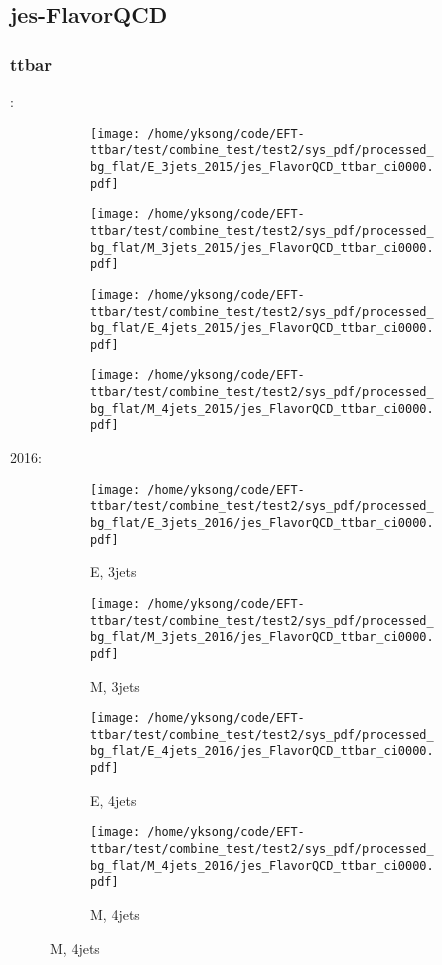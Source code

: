 \documentclass{beamer}
\begin{document}
\subsection{jes-FlavorQCD}

\begin{frame}
\frametitle{ttbar}
\fontsize{5}{1}:
\begin{figure}
\centering
\begin{subfigure}[b]{0.24\textwidth}
\texttt{[image: /home/yksong/code/EFT-ttbar/test/combine\_test/test2/sys\_pdf/processed\_bg\_flat/E\_3jets\_2015/jes\_FlavorQCD\_ttbar\_ci0000.pdf]}
\end{subfigure}
\begin{subfigure}[b]{0.24\textwidth}
\texttt{[image: /home/yksong/code/EFT-ttbar/test/combine\_test/test2/sys\_pdf/processed\_bg\_flat/M\_3jets\_2015/jes\_FlavorQCD\_ttbar\_ci0000.pdf]}
\end{subfigure}
\begin{subfigure}[b]{0.24\textwidth}
\texttt{[image: /home/yksong/code/EFT-ttbar/test/combine\_test/test2/sys\_pdf/processed\_bg\_flat/E\_4jets\_2015/jes\_FlavorQCD\_ttbar\_ci0000.pdf]}
\end{subfigure}
\begin{subfigure}[b]{0.24\textwidth}
\texttt{[image: /home/yksong/code/EFT-ttbar/test/combine\_test/test2/sys\_pdf/processed\_bg\_flat/M\_4jets\_2015/jes\_FlavorQCD\_ttbar\_ci0000.pdf]}
\end{subfigure}
\end{figure}
2016:
\begin{figure}
\centering
\begin{subfigure}[b]{0.24\textwidth}
\texttt{[image: /home/yksong/code/EFT-ttbar/test/combine\_test/test2/sys\_pdf/processed\_bg\_flat/E\_3jets\_2016/jes\_FlavorQCD\_ttbar\_ci0000.pdf]}
\captionsetup{font=tiny}
\caption{E, 3jets}
\end{subfigure}
\begin{subfigure}[b]{0.24\textwidth}
\texttt{[image: /home/yksong/code/EFT-ttbar/test/combine\_test/test2/sys\_pdf/processed\_bg\_flat/M\_3jets\_2016/jes\_FlavorQCD\_ttbar\_ci0000.pdf]}
\captionsetup{font=tiny}
\caption{M, 3jets}
\end{subfigure}
\begin{subfigure}[b]{0.24\textwidth}
\texttt{[image: /home/yksong/code/EFT-ttbar/test/combine\_test/test2/sys\_pdf/processed\_bg\_flat/E\_4jets\_2016/jes\_FlavorQCD\_ttbar\_ci0000.pdf]}
\captionsetup{font=tiny}
\caption{E, 4jets}
\end{subfigure}
\begin{subfigure}[b]{0.24\textwidth}
\texttt{[image: /home/yksong/code/EFT-ttbar/test/combine\_test/test2/sys\_pdf/processed\_bg\_flat/M\_4jets\_2016/jes\_FlavorQCD\_ttbar\_ci0000.pdf]}
\captionsetup{font=tiny}
\caption{M, 4jets}
\end{subfigure}
\end{figure}
\end{frame}
\end{document}
